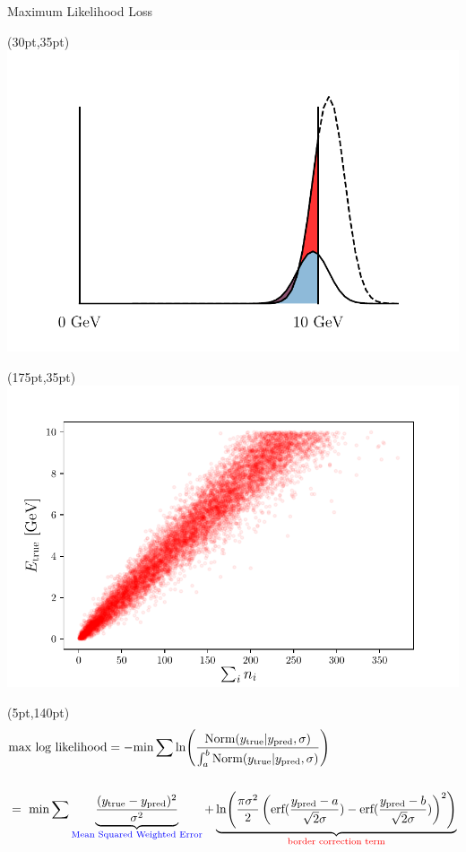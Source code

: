 \documentclass[10pt]{beamer}
\begin{document}
\begin{frame}{Maximum Likelihood Loss}
  \begin{textblock*}{150pt}(30pt,35pt)
      \includegraphics[width=\textwidth]{../images/gaussian_shift.pdf}
  \end{textblock*}
  \begin{textblock*}{150pt}(175pt,35pt)
      \includegraphics[width=\textwidth]{../images/e-vs-sum_n.pdf}
  \end{textblock*}

  \begin{textblock*}{150pt}(5pt,140pt)
    \begin{align*}
      &\text{max log likelihood} = -\text{min} \sum \ln(\frac{\text{Norm}(y_{\text{true}} | y_{\text{pred}}, \sigma)}{\int^b_a \text{Norm}(y_{\text{true}} | y_{\text{pred}}, \sigma)})\\ \\
                                            &=\ \text{min} \sum \underbrace{\frac{(y_{\text{true}}-y_{\text{pred}})^2}{\sigma^2}}_{\text{\textcolor{blue}{Mean Squared Weighted Error}}} +\underbrace{\ln(\frac{\pi \sigma^2}{2} \left(\text{erf}(\frac{y_{\text{pred}}-a}{\sqrt{2}\sigma}) - \text{erf}(\frac{y_{\text{pred}}-b}{\sqrt{2}\sigma})\right)^2)}_{\text{\textcolor{red}{border correction term}}}
    \end{align*}
  \end{textblock*}


\end{frame}
\end{document}
